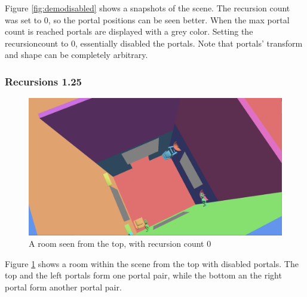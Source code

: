 Figure \ref{fig:demodisabled} shows a snapshots of the scene. The recursion count was set to 0,  so the portal positions can be seen better. When the max portal count is reached portals are displayed with a grey color. Setting the \gls{recursioncount} to 0, essentially disabled the portals. Note that portals' transform and shape can be completely arbitrary.

\subsubsection{Recursions 1.25}

\begin{figure}[H]
	\centering
	\includegraphics[width=\linewidth]{images/room.png}
	\caption{A room seen from the top, with recursion count 0}
	\label{fig:roomlayout}
\end{figure}

Figure \ref{fig:roomlayout} shows a room within the scene from the top with disabled portals. The top and the left portals form one portal pair, while the bottom an the right portal form another portal pair.

